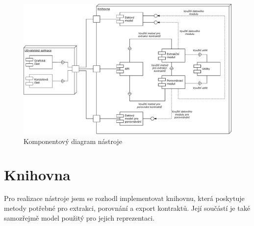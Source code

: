 	\begin{figure}[!htb]
			\centering
			\includegraphics[width=1\textwidth]{img/componentDiagram.pdf}
			\caption[componentDiagram]{Komponentový diagram nástroje}
			\label{componentDiagram}
		\endminipage\hfill
	\end{figure}		
	
	
	\section{Knihovna}
		Pro realizace nástroje jsem se rozhodl implementovat knihovnu, která poskytuje metody potřebné pro extrakci, porovnání a export kontraktů. Její součástí je také samozřejmě model použitý pro jejich reprezentaci. 


